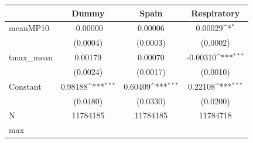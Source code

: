 {
\def\sym#1{\ifmmode^{#1}\else\(^{#1}\)\fi}
\begin{tabular}{l*{3}{c}}
\toprule
            &\multicolumn{1}{c}{Dummy}&\multicolumn{1}{c}{Spain}&\multicolumn{1}{c}{Respiratory}\\
\midrule
meanMP10    &    -0.00000         &     0.00006         &     0.00029\sym{*}  \\
            &    (0.0004)         &    (0.0003)         &    (0.0002)         \\
tmax\_mean   &     0.00179         &     0.00070         &    -0.00310\sym{***}\\
            &    (0.0024)         &    (0.0017)         &    (0.0010)         \\
Constant    &     0.98188\sym{***}&     0.60409\sym{***}&     0.22108\sym{***}\\
            &    (0.0480)         &    (0.0330)         &    (0.0200)         \\
\midrule
N           &    11784185         &    11784185         &    11784718         \\
max         &                     &                     &                     \\
\bottomrule
\end{tabular}
}
